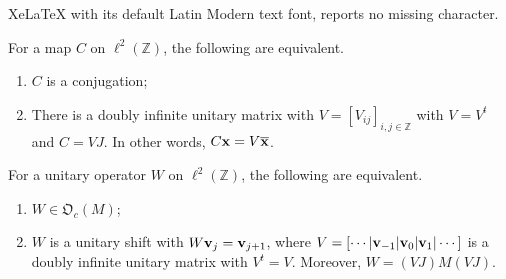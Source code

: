 \documentclass[10pt,a4paper]{amsart}
\def\Z{\mathbb{Z}}
\renewcommand{\vec}[1]{{\bf #1}}
\begin{document}
XeLaTeX with its default Latin Modern text font, reports no missing character.
\begin{Proposition}\label{OShfgfdsfa}
For a map $C$ on $\ell^2(\Z)$, the following are equivalent. 
\begin{enumerate}
\item $C$ is a conjugation; 
\item There is a doubly infinite unitary matrix with $V = [V_{i j}]_{i, j \in \Z}$ with $V = V^{t}$ and $C = V J$. In other words, $C \vec{x} = V \overline{\vec{x}}$.
\end{enumerate}
\end{Proposition}

\begin{Theorem}\label{0934t4rhhHHCccvvJ}
For a unitary operator $W$ on $\ell^2(\Z)$, the following are equivalent. 
\begin{enumerate}
\item $W \in \mathfrak{O}_c(M)$; 
\item $W$ is a unitary shift with $W \vec{v}_{j} = \vec{v}_{j + 1}$, where $V = [\cdots| \vec{v}_{-1}|\vec{v}_0|\vec{v}_1|\cdots]$ is a doubly infinite unitary matrix with $V^{t} = V$. Moreover, $W = (VJ) M (VJ)$.
\end{enumerate}
\end{Theorem}
\end{document}
